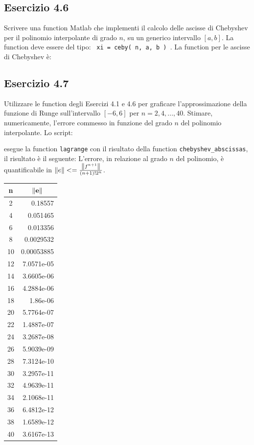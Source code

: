 	\subsection {Esercizio 4.6}
	
Scrivere una function Matlab che implementi il calcolo delle ascisse di Chebyshev per il polinomio interpolante di grado $n$, su un generico intervallo $[a,b]$. La function deve essere del tipo: \texttt { xi = ceby( n, a, b ) }.
\PP
La function per le ascisse di Chebyshev è:




	\subsection {Esercizio 4.7}
	
Utilizzare le function degli Esercizi 4.1 e 4.6 per graficare l'approssimazione della funzione di Runge sull'intervallo $[-6,6]$ per $n= 2,4, ... ,40$. Stimare, numericamente, l'errore commesso in funzione del grado $n$ del polinomio interpolante.
\PP
Lo script:

esegue la function \lstinline{lagrange} con il risultato della function \lstinline{chebyshev_abscissas}, il risultato è il seguente:
L'errore, in relazione al grado $n$ del polinomio, è quantificabile in $\norm{e} <= \frac{\norm{f^{n+1}}}{(n+1)!2^n}$.

\begin{tabular}{ c | r }
\textbf{n} & \multicolumn{1}{c}{$\mathbf{\norm{e}}$} \\
\hline
2  &   0.18557  \\
4  &  0.051465  \\
6  &  0.013356  \\
8  & 0.0029532  \\
10 & 0.00053885 \\
12 & 7.0571e-05 \\
14 & 3.6605e-06 \\
16 & 4.2884e-06 \\
18 &   1.86e-06 \\
20 & 5.7764e-07 \\
22 & 1.4887e-07 \\
24 & 3.2687e-08 \\
26 & 5.9039e-09 \\
28 & 7.3124e-10 \\
30 & 3.2957e-11 \\
32 & 4.9639e-11 \\
34 & 2.1068e-11 \\
36 & 6.4812e-12 \\
38 & 1.6589e-12 \\
40 & 3.6167e-13
\end{tabular}



